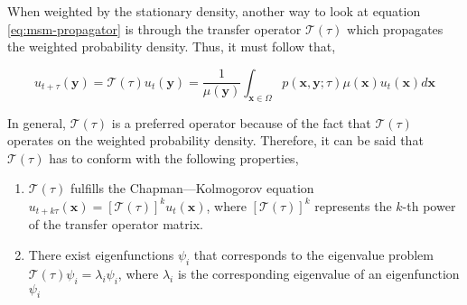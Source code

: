 \begin{spacing}{2.0}
    When weighted by the stationary density, another way to look at equation \ref{eq:msm-propagator} is through the transfer operator $\mathcal{T}(\tau)$
    which propagates the weighted probability density. Thus, it must follow that,

    \begin{equation}
        u_{t+\tau}(\mathbf{y}) = \mathcal{T}(\tau)u_t(\mathbf{y}) = \frac{1}{\mu(\mathbf{y})}
            \int_{\mathbf{x}\in\Omega}p(\mathbf{x},\mathbf{y};\tau)\mu(\mathbf{x})u_t(\mathbf{x})d\mathbf{x}
        \label{eq:msm-weighted-propagator}
    \end{equation}

    In general, $\mathcal{T}(\tau)$ is a preferred operator because of the fact that $\mathcal{T}(\tau)$ operates on the weighted probability density. 
    Therefore, it can be said that $\mathcal{T}(\tau)$ has to conform with the following properties,

    \begin{enumerate}
        \item{$\mathcal{T}(\tau)$ fulfills the Chapman—Kolmogorov equation $u_{t+k\tau}(\mathbf{x}) = \left[\mathcal{T}(\tau)\right]^k u_t(\mathbf{x})$,
              where $\left[\mathcal{T}(\tau)\right]^k$ represents the $k$-th power of the transfer operator matrix.}
        \item{There exist eigenfunctions $\psi_i$ that corresponds to the eigenvalue problem $\mathcal{T}(\tau)\psi_i = \lambda_i\psi_i$, where
              $\lambda_i$ is the corresponding eigenvalue of an eigenfunction $\psi_i$}
    \end{enumerate}
\end{spacing}
